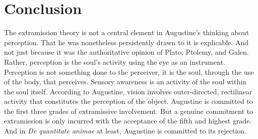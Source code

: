 \documentclass[12pt]{article}
\begin{document}


\section{Conclusion} %
\label{sec:conclusion}

The extramission theory is not a central element in Augustine’s thinking about perception. That he was nonetheless persistently drawn to it is explicable. And not just because it was the authoritative opinion of Plato, Ptolemy, and Galen. Rather, perception is the soul’s activity using the eye as an instrument. Perception is not something done to the perceiver, it is the soul, through the use of the body, that perceives. Sensory awareness is an activity of the soul within the soul itself. According to Augustine, vision involves outer-directed, rectilinear activity that constitutes the perception of the object. Augustine is committed to the first three grades of extramissive involvement. But a genuine commitment to extramission is only incurred with the acceptance of the fifth and highest grade. And in \emph{De quantitate animae} at least, Augustine is committed to its rejection.






\nocite{Tourscher:1933rw}
\nocite{Dodds:1963ul}
\nocite{Migne:1845aa}
\nocite{Migne:1856aa}
\nocite{Lacy:1980mk}
\nocite{Castellote:1978qe}
\nocite{Sorabji:1997ly}



\end{document}
